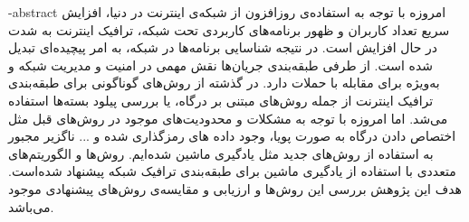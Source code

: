\department{}

\fa-abstract{
امروزه با توجه به استفاده‌ی روزافزون از شبکه‌ی اینترنت در دنیا، افزایش سریع تعداد کاربران و ظهور
برنامه‌های کاربردی تحت شبکه، ترافیک اینترنت به شدت در حال افزایش است. در نتیجه شناسایی
برنامه‌ها در شبکه، به امر پیچیده‌ای تبدیل شده است. از طرفی طبقه‌بندی جریان‌ها نقش مهمی در
امنیت و مدیریت شبکه و به‌ویژه برای مقابله با حملات دارد.
در گذشته از روش‌های گوناگونی برای طبقه‌بندی ترافیک اینترنت از جمله روش‌های مبتنی بر درگاه، یا
بررسی پیلود بسته‌ها استفاده می‌شد. اما امروزه با توجه به مشکلات و محدودیت‌های موجود در 
روش‌های قبل مثل اختصاص دادن درگاه به صورت پویا، وجود داده های رمزگذاری شده و ... ناگزیر مجبور
به استفاده از روش‌های جدید مثل یادگیری ماشین شده‌ایم.
روش‌ها و الگوریتم‌های متعددی با استفاده از یادگیری ماشین برای طبقه‌بندی ترافیک شبکه پیشنهاد
شده‌است. هدف این پژوهش بررسی این روش‌ها و ارزیابی و مقایسه‌ی روش‌های پیشنهادی موجود
می‌باشد.
}





\AUTtitle
